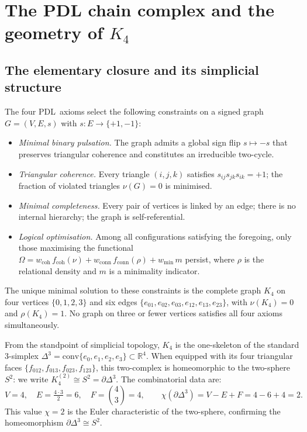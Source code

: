 \documentclass[11pt,a4paper]{article}
\theoremstyle{definition}
\newcommand{\PDL}{\textnormal{PDL}}
\newcommand{\Kfour}{K_4}
\newcommand{\Sfour}{\partial\Delta^3}
\begin{document}
\section{The PDL chain complex and the geometry of \texorpdfstring{$K_4$}{K4}}
\label{sec:complex}

\subsection{The elementary closure and its simplicial structure}
\label{subsec:K4}

The four \PDL\ axioms select the following constraints on a signed graph $G = (V, E, s)$ with $s : E \to \{+1, -1\}$:\cite{PDL_Main_2026}
\begin{itemize}
  \item \emph{Minimal binary pulsation.} The graph admits a global sign flip $s \mapsto -s$ that preserves triangular coherence and constitutes an irreducible two-cycle.
  \item \emph{Triangular coherence.} Every triangle $(i,j,k)$ satisfies $s_{ij}s_{jk}s_{ik} = +1$; the fraction of violated triangles $\nu(G) = 0$ is minimised.
  \item \emph{Minimal completeness.} Every pair of vertices is linked by an edge; there is no internal hierarchy; the graph is self-referential.
  \item \emph{Logical optimisation.} Among all configurations satisfying the foregoing, only those maximising the functional $\Omega = w_{\mathrm{coh}}\,f_{\mathrm{coh}}(\nu) + w_{\mathrm{conn}}\,f_{\mathrm{conn}}(\rho) + w_{\min}\,m$ persist, where $\rho$ is the relational density and $m$ is a minimality indicator.
\end{itemize}
The unique minimal solution to these constraints is the complete graph $\Kfour$ on four vertices $\{0,1,2,3\}$ and six edges $\{e_{01}, e_{02}, e_{03}, e_{12}, e_{13}, e_{23}\}$, with $\nu(\Kfour) = 0$ and $\rho(\Kfour) = 1$.\cite{PDL_Main_2026} No graph on three or fewer vertices satisfies all four axioms simultaneously.

From the standpoint of simplicial topology, $\Kfour$ is the one-skeleton of the standard $3$-simplex $\Delta^3 = \mathrm{conv}\{e_0, e_1, e_2, e_3\} \subset \mathbb{R}^4$. When equipped with its four triangular faces $\{f_{012}, f_{013}, f_{023}, f_{123}\}$, this two-complex is homeomorphic to the two-sphere $S^2$: we write $\Kfour^{(2)} \cong S^2 = \Sfour$. The combinatorial data are:
\[
  V = 4, \quad E = \tfrac{4 \cdot 3}{2} = 6, \quad F = \binom{4}{3} = 4,
  \qquad \chi(\Sfour) = V - E + F = 4 - 6 + 4 = 2.
\]
This value $\chi = 2$ is the Euler characteristic of the two-sphere, confirming the homeomorphism $\Sfour \cong S^2$.
\end{document}

